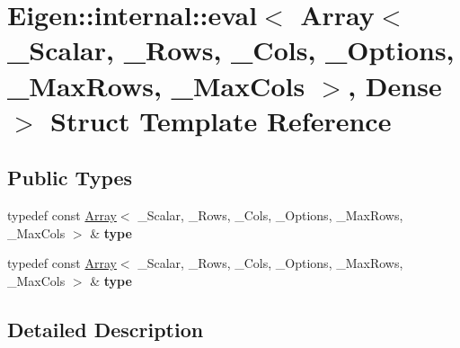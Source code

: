 \hypertarget{struct_eigen_1_1internal_1_1eval_3_01_array_3_01___scalar_00_01___rows_00_01___cols_00_01___optifb38e4e42f3aa82ee965fe5a912f110a}{}\section{Eigen\+:\+:internal\+:\+:eval$<$ Array$<$ \+\_\+\+Scalar, \+\_\+\+Rows, \+\_\+\+Cols, \+\_\+\+Options, \+\_\+\+Max\+Rows, \+\_\+\+Max\+Cols $>$, Dense $>$ Struct Template Reference}
\label{struct_eigen_1_1internal_1_1eval_3_01_array_3_01___scalar_00_01___rows_00_01___cols_00_01___optifb38e4e42f3aa82ee965fe5a912f110a}
\subsection*{Public Types}
\begin{DoxyCompactItemize}
\item 
\mbox{\label{struct_eigen_1_1internal_1_1eval_3_01_array_3_01___scalar_00_01___rows_00_01___cols_00_01___optifb38e4e42f3aa82ee965fe5a912f110a_ad013ed14d1da137adf926ae866cd111d}} 
typedef const \hyperlink{group___core___module_class_eigen_1_1_array}{Array}$<$ \+\_\+\+Scalar, \+\_\+\+Rows, \+\_\+\+Cols, \+\_\+\+Options, \+\_\+\+Max\+Rows, \+\_\+\+Max\+Cols $>$ \& {\bfseries type}
\item 
\mbox{\label{struct_eigen_1_1internal_1_1eval_3_01_array_3_01___scalar_00_01___rows_00_01___cols_00_01___optifb38e4e42f3aa82ee965fe5a912f110a_ad013ed14d1da137adf926ae866cd111d}} 
typedef const \hyperlink{group___core___module_class_eigen_1_1_array}{Array}$<$ \+\_\+\+Scalar, \+\_\+\+Rows, \+\_\+\+Cols, \+\_\+\+Options, \+\_\+\+Max\+Rows, \+\_\+\+Max\+Cols $>$ \& {\bfseries type}
\end{DoxyCompactItemize}


\subsection{Detailed Description}
